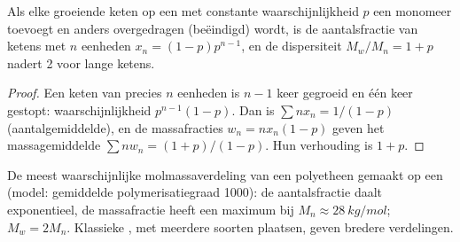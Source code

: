 \begin{proposition}\label{prop:b3:homogeneous-catalysis:schulz-flory}
Als elke groeiende keten op een  met constante
waarschijnlijkheid $p$ een monomeer toevoegt en anders overgedragen (beëindigd) wordt, is de aantalsfractie van
ketens met $n$ eenheden $x_n = (1 - p)p^{n-1}$, en de dispersiteit $M_w/M_n = 1 + p$ nadert 2 voor lange ketens.
\end{proposition}

\begin{proof}
Een keten van precies $n$ eenheden is $n - 1$ keer gegroeid en één keer gestopt:
waarschijnlijkheid $p^{n-1}(1 - p)$. Dan is $\sum nx_n = 1/(1 - p)$ (aantalgemiddelde), en de
massafracties $w_n = nx_n(1 - p)$ geven het massagemiddelde $\sum nw_n = (1 + p)/(1 - p)$. Hun
verhouding is $1 + p$.
\end{proof}

\begin{omfigure}

{\small De meest waarschijnlijke molmassaverdeling van een polyetheen
gemaakt op een  (model: gemiddelde
polymerisatiegraad 1000): de aantalsfractie daalt exponentieel, de massafractie heeft een maximum bij $M_n \approx \qty{28}{kg/mol}$; $M_w = 2M_n$. Klassieke
, met meerdere soorten plaatsen, geven bredere
verdelingen.}
\end{omfigure}

